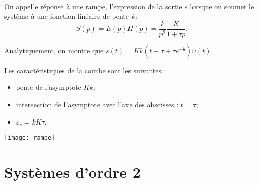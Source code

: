 \begin{resultat}~\\

\noindent \begin{minipage}[c]{.65\linewidth}
On appelle réponse à une rampe, l'expression de la sortie $s$ lorsque on soumet le système à une fonction linéaire de pente $k$: 
$$
S(p)=E(p)H(p) = \dfrac{k}{p^2} \dfrac{K}{1+\tau p}.
$$ 


Analytiquement, on montre que $s(t)=Kk \left(t-\tau+\tau e^{-\frac{t}{\tau}}\right)u(t)$. 

Les caractéristiques de la courbe sont les suivantes : 
\begin{itemize}
\item pente de l'asymptote $K k$;
\item intersection de l'asymptote avec l'axe des abscisses : $t=\tau$;
\item $\varepsilon_{v}=kK\tau$.
\end{itemize}


\end{minipage} \hfill
\begin{minipage}[c]{.32\linewidth}
\centering
\texttt{[image: rampe]}
\end{minipage}
\end{resultat}



\section{Systèmes d'ordre 2}

